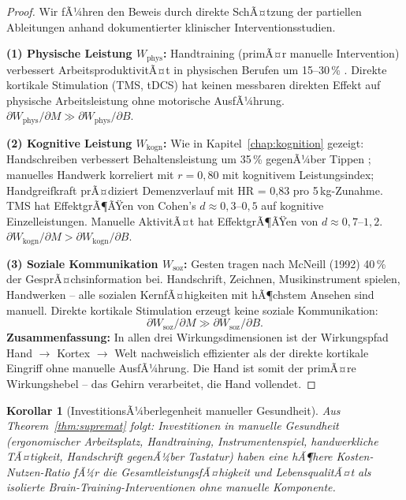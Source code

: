 ﻿\documentclass[12pt,a4paper]{report}
\theoremstyle{plain}
\newtheorem{korollar}[theorem]{Korollar}
\theoremstyle{definition}
\theoremstyle{remark}
\begin{document}
\begin{proof}
Wir fÃ¼hren den Beweis durch direkte SchÃ¤tzung der partiellen Ableitungen
anhand dokumentierter klinischer Interventionsstudien.

\textbf{(1) Physische Leistung $W_{\text{phys}}$:}
Handtraining (primÃ¤r manuelle Intervention) verbessert ArbeitsproduktivitÃ¤t
in physischen Berufen um 15--30\,\% \cite{silverstein1987}. Direkte kortikale
Stimulation (TMS, tDCS) hat keinen messbaren direkten Effekt auf physische
Arbeitsleistung ohne motorische AusfÃ¼hrung.
$\partial W_{\text{phys}}/\partial M \gg \partial W_{\text{phys}}/\partial B$.

\textbf{(2) Kognitive Leistung $W_{\text{kogn}}$:}
Wie in Kapitel~\ref{chap:kognition} gezeigt: Handschreiben verbessert
Behaltensleistung um 35\,\% gegenÃ¼ber Tippen \cite{mueller2014};
manuelles Handwerk korreliert mit $r = 0{,}80$ mit kognitivem Leistungsindex;
Handgreifkraft prÃ¤diziert Demenzverlauf mit HR = 0{,}83 pro 5\,kg-Zunahme.
TMS hat EffektgrÃ¶ÃŸen von Cohen's $d \approx 0{,}3$--$0{,}5$ auf kognitive
Einzelleistungen. Manuelle AktivitÃ¤t hat EffektgrÃ¶ÃŸen von $d \approx 0{,}7$--$1{,}2$.
$\partial W_{\text{kogn}}/\partial M > \partial W_{\text{kogn}}/\partial B$.

\textbf{(3) Soziale Kommunikation $W_{\text{soz}}$:}
Gesten tragen nach McNeill (1992) 40\,\% der GesprÃ¤chsinformation bei.
Handschrift, Zeichnen, Musikinstrument spielen, Handwerken -- alle sozialen
KernfÃ¤higkeiten mit hÃ¶chstem Ansehen sind manuell. Direkte kortikale
Stimulation erzeugt keine soziale Kommunikation:
\[
  \partial W_{\text{soz}}/\partial M \gg \partial W_{\text{soz}}/\partial B.
\]
\textbf{Zusammenfassung:} In allen drei Wirkungsdimensionen ist der
Wirkungspfad Hand $\to$ Kortex $\to$ Welt nachweislich effizienter
als der direkte kortikale Eingriff ohne manuelle AusfÃ¼hrung. Die Hand ist
somit der primÃ¤re Wirkungshebel -- das Gehirn verarbeitet, die Hand vollendet.
\end{proof}

\begin{korollar}[InvestitionsÃ¼berlegenheit manueller Gesundheit]
Aus Theorem~\ref{thm:supremat} folgt: Investitionen in manuelle Gesundheit
(ergonomischer Arbeitsplatz, Handtraining, Instrumentenspiel, handwerkliche
TÃ¤tigkeit, Handschrift gegenÃ¼ber Tastatur) haben eine hÃ¶here Kosten-Nutzen-Ratio
fÃ¼r die GesamtleistungsfÃ¤higkeit und LebensqualitÃ¤t als isolierte
Brain-Training-Interventionen ohne manuelle Komponente.
\end{korollar}
\end{document}
